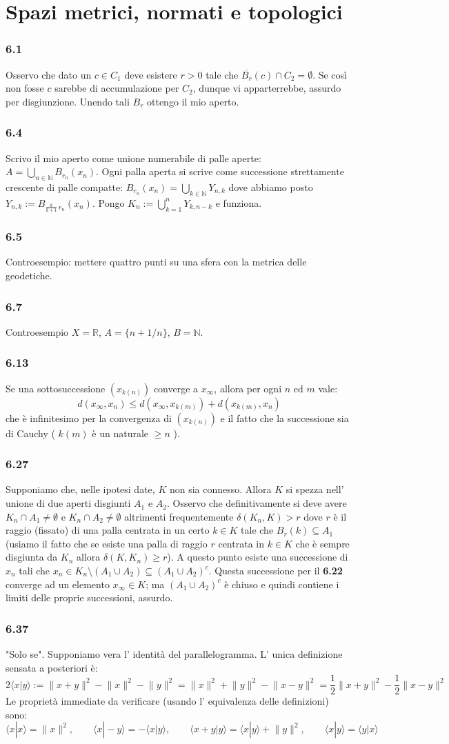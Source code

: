 \documentclass[a4paper,11pt]{article}
\newcommand{\ex}[1]{\subsubsection*{#1}}
\newcommand{\NN}{\mathbb{N}}
\newcommand{\RR}{\mathbb{R}}
\newcommand{\Norm}[1]{ \lVert {#1} \rVert}
\newcommand{\rec}[1]{{\bf #1}}
\begin{document}
\section{Spazi metrici, normati e topologici}
\ex{6.1} Osservo che dato un $c\in C_1$ deve esistere $r>0$ tale che $\overline{B_{r}}(c)\cap C_2=\emptyset$. Se così non fosse $c$ sarebbe di accumulazione per $C_2$, dunque vi apparterrebbe, assurdo per disgiunzione. Unendo tali $B_r$ ottengo il mio aperto.
\ex{6.4} Scrivo il mio aperto come unione numerabile di palle aperte: $A=\bigcup_{n\in\NN}B_{r_n}(x_n)$. Ogni palla aperta si scrive come successione strettamente crescente di palle compatte: $B_{r_n}(x_n)=\bigcup_{k\in\NN}Y_{n,k}$ dove abbiamo posto $Y_{n,k}:=B_{ \frac {k}{k+1}\, r_n}(x_n)$. Pongo $\displaystyle K_n:=\bigcup_{k=1}^n Y_{k,n-k}$ e funziona.
\ex{6.5} Controesempio: mettere quattro punti su una sfera con la metrica delle geodetiche.
\ex{6.7} Controesempio $X=\RR$, $A=\{n+1/n\}$, $B=\NN$.
\ex{6.13} Se una sottosuccessione \( (x_{k(n)})\) converge a \(x_{\infty}\), allora per ogni \(n\) ed $m$ vale: 
\[ d(x_{\infty},x_n) \le d\left({x_{\infty}, x_{k(m)}}\right) + d\left({x_{k(m)},x_n}\right) \]
che è infinitesimo per la convergenza di \( \left({x_{k(n)}}\right)\) e il fatto che la successione sia di Cauchy ( \(k(m)\) è un naturale \(\ge n\) ).
\ex{6.27} Supponiamo che, nelle ipotesi date, $K$ non sia connesso. Allora $K$ si spezza nell' unione di due aperti disgiunti $A_1$ e $A_2$. Osservo che definitivamente si deve avere $K_n \cap A_1 \neq \emptyset$ e $K_n \cap A_2 \neq \emptyset$ altrimenti frequentemente $\delta (K_n, K)>r$ dove $r$ è il raggio (fissato) di una palla centrata in un certo $k\in K$ tale che $B_r(k)\subseteq A_1$ (usiamo il fatto che se esiste una palla di raggio $r$ centrata in $k\in K$ che è sempre disgiunta da $K_n$ allora $\delta(K,K_n)\geq r$). A questo punto esiste una successione di $x_n$ tali che $x_n\in K_n\setminus (A_1 \cup A_2)\subseteq (A_1 \cup A_2)^c$. Questa successione per il \rec{6.22} converge ad un elemento $x_{\infty}\in K$; ma $(A_1 \cup A_2)^c$ è chiuso e quindi contiene i limiti delle proprie successioni, assurdo.
\ex{6.37} "Solo se". Supponiamo vera l' identità del parallelogramma. L' unica definizione sensata a posteriori è:
$$
2\langle x | y\rangle :=\Norm{x+y}^2-\Norm{x}^2-\Norm{y}^2=\Norm{x}^2+\Norm{y}^2-\Norm{x-y}^2=\frac{1}{2}\Norm{x+y}^2-\frac{1}{2}\Norm{x-y}^2
$$
Le proprietà immediate da verificare (usando l' equivalenza delle definizioni) sono:
$$
\langle x |x \rangle=\Norm{x}^2,\qquad  \langle x | -y \rangle = - \langle x | y \rangle, \qquad \langle x+y|y\rangle=\langle x|y\rangle +\Norm{y}^2,\qquad \langle x |y \rangle=\langle y |x \rangle
$$
\end{document}
